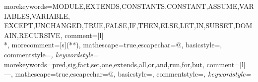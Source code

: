 \usepackage{mathpartir}
\usepackage{amsthm}
\usepackage{amsmath}
\usepackage{amssymb}
\usepackage{mathtools}
\usepackage{listings}
\usepackage{tlalatex}

  {morekeywords={MODULE,EXTENDS,CONSTANTS,CONSTANT,ASSUME,VARIABLES,VARIABLE,
          EXCEPT,UNCHANGED,TRUE,FALSE,IF,THEN,ELSE,LET,IN,SUBSET,DOMAIN,RECURSIVE},
          comment=[l]{\\*},
  morecomment=[s]{(*}{*)},
  mathescape=true,escapechar={@},
  basicstyle=\sffamily,%
  commentstyle=\itshape\rmfamily,%
  keywordstyle=\sffamily%
}
  {morekeywords={pred,sig,fact,set,one,extends,all,or,and,run,for,but},
          comment=[l]{---},
  mathescape=true,escapechar={@},
  basicstyle=\sffamily,%
  commentstyle=\itshape\rmfamily,%
  keywordstyle=\sffamily\bfseries
}

\newtheorem{theorem}{Theorem}[section]
\newtheorem{lemma}[theorem]{Lemma}
\newtheorem{corollary}[theorem]{Corollary}

\newcommand{\iteDef}[4]{
  #1 \coloneqq \left\{
\begin{array}{ll}
      #2 &; #3 \\
      #4 &; \text{otherwise}\\
\end{array} 
\right. 
}

\newcommand{\tlap}{$\textsc{TLA}^{+}$}

\newcommand{\nat}{\mathbb N_0}

\newcommand{\op}{\mathrm{R}}
\newcommand{\nrop}{\mathrm{I}}
\newcommand{\mop}{\mathrm{R}_m}
\newcommand{\mapg}{\mathrm{G}_m}
\newcommand{\bb}{\mathrm{next}}
\newcommand{\Chain}{\mathrm{Stack}}

\newcommand{\tup}[1]{\left<\left<#1\right>\right>}
\newcommand{\htau}{\hat{\tau}}

\newcommand{\List}{\mathrm{List}}
\newcommand{\Seq}{\mathrm{Seq}}
\newcommand{\Set}{\mathrm{Set}}
\newcommand{\PVec}{\mathrm{PVec}}
\newcommand{\PSet}{\mathrm{PSet}}
\newcommand{\PMap}{\mathrm{PMap}}
\newcommand{\Concat}{\mathrm{Concat}}
\newcommand{\Callable}{\mathrm{Callable}}
\newcommand{\Le}{\mathrm{Le}}
\newcommand{\bool}{\mathrm{bool}}
\newcommand{\Bool}{\mathrm{Bool}}
\newcommand{\pyint}{\mathrm{int}}
\newcommand{\Int}{\mathrm{Int}}
\newcommand{\ApaFoldSet}{\mathrm{ApaFoldSet}}
\newcommand{\ApaFoldSeqLeft}{\mathrm{ApaFoldSeqLeft}}
\newcommand{\MkSeq}{\mathrm{MkSeq}}
\newcommand{\SetAsFun}{\mathrm{SetAsFun}}
\newcommand{\Push}{\mathrm{Push}}
\newcommand{\At}{\mathrm{At}}
\newcommand{\Indices}{\mathrm{Indices}}



